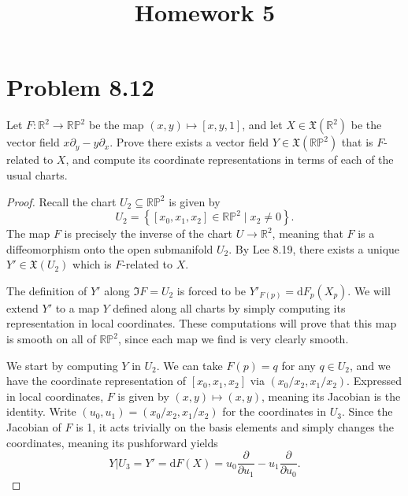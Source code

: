 \documentclass[11pt, letterpaper]{article}
\title{Homework 5}
\begin{document}
\makeproblem

\section{Problem 8.12}
\begin{problem}
	Let $F : \mathbb{R} ^2 \to \mathbb{R} \mathbb{P} ^2$ be the map $(x,y)\mapsto [x,y,1]$, and let $X\in \mathfrak{X} (\mathbb{R} ^2)$ be the vector field $x \partial _y-y \partial _x$. Prove there exists a vector field $Y\in \mathfrak{X} (\mathbb{R} \mathbb{P} ^2)$ that is $F$-related to $X$, and compute its coordinate representations in terms of each of the usual charts.
\end{problem}
\begin{proof}
	Recall the chart $U_2 \subseteq \mathbb{R} \mathbb{P} ^2$ is given by
	\[
		U_2 = \left\{ [x_0,x_1,x_2]\in\mathbb{R} \mathbb{P} ^2\mid x_2 \neq 0 \right\} 
	.\]
	The map $F$ is precisely the inverse of the chart $U\to \mathbb{R} ^2$, meaning that $F$ is a diffeomorphism onto the open submanifold $U_2$. By Lee 8.19, there exists a unique $Y'\in \mathfrak{X} (U_2)$ which is $F$-related to $X$.

	The definition of $Y'$ along $\Im F=U_2$ is forced to be $Y'_{F(p)} =\mathrm{d} F_p (X_p)$. We will extend $Y'$ to a map $Y$ defined along all charts by simply computing its representation in local coordinates. These computations will prove that this map is smooth on all of $\mathbb{R} \mathbb{P} ^2$, since each map we find is very clearly smooth.

	We start by computing $Y$ in $U_2$. We can take $F(p)=q$ for any $q\in U_2$, and we have the coordinate representation of $[x_0,x_1,x_2]$ via $(x_0/x_2,x_1/x_2)$. Expressed in local coordinates, $F$ is given by $(x,y)\mapsto (x,y)$, meaning its Jacobian is the identity. Write $(u_0,u_1)=(x_0/x_2,x_1/x_2)$ for the coordinates in $U_3$. Since the Jacobian of $F$ is 1, it acts trivially on the basis elements and simply changes the coordinates, meaning its pushforward yields
	\[
		Y|U_3=Y' =\mathrm{d} F(X)=u_0 \frac{\partial }{\partial u_1} -u_1 \frac{\partial }{\partial u_0} 
	.\]


\end{proof}
\end{document}
